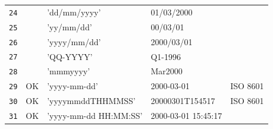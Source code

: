 \begin{table}[htp]
\begin{center}
\begin{tabular}{|c|c|l|l|l|}
\texttt{24}		&		& 'dd/mm/yyyy'				& 01/03/2000	&\\
\texttt{25}		&		& 'yy/mm/dd'				& 00/03/01	&\\
\texttt{26}		&		& 'yyyy/mm/dd'				& 2000/03/01	&\\
\texttt{27}		&		& 'QQ-YYYY'					& Q1-1996	&\\
\texttt{28}		&		& 'mmmyyyy'					& Mar2000	&\\
\texttt{29}		& OK	& 'yyyy-mm-dd'				& 2000-03-01	& ISO 8601\\
\texttt{30}		& OK	& 'yyyymmddTHHMMSS'			& 20000301T154517	& ISO 8601\\
\texttt{31}		& OK	& 'yyyy-mm-dd HH:MM:SS'		& 2000-03-01 15:45:17	&\\
\hline
\end{tabular}
\end{center}
\label{datestr}
\end{table}


